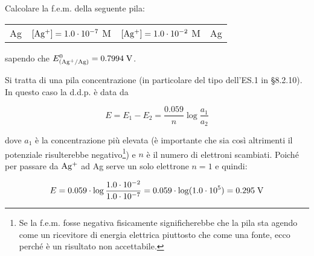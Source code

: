 \begin{esercizio}
    Calcolare la f.e.m. della seguente pila:

\begin{center}
    \begin{tabular}{p{0.6cm}|p{3.6cm}||p{3.6cm}|p{1cm}}
        Ag & $[\rm Ag^+]=1.0 \cdot 10^{-7}$ M & $[\rm Ag^+]=1.0 \cdot 10^{-2}$ M & Ag
    \end{tabular}
\end{center}

sapendo che $E^0_{(\rm Ag^{+}/Ag)}=0.7994 \; \rm V$.
\end{esercizio}
\begin{soluzione}
    Si tratta di una pila concentrazione (in particolare del tipo dell'ES.1 in §8.2.10). In questo caso la d.d.p. è data da

$$E=E_1 - E_2 = \frac{0.059}{n} \log \frac{a_1}{a_2}$$

dove $a_1$ è la concentrazione più elevata (è importante che sia così altrimenti il potenziale risulterebbe negativo\footnote{Se la f.e.m. fosse negativa fisicamente significherebbe che la pila sta agendo come un ricevitore di energia elettrica piuttosto che come una fonte, ecco perché è un risultato non accettabile.}) e $n$ è il numero di elettroni scambiati. Poiché per passare da $\rm Ag^{+}$ ad Ag serve un solo elettrone $n=1$ e quindi:

\begin{equation*}
    E=0.059 \cdot \log \frac{1.0 \cdot 10^{-2}}{1.0 \cdot 10^{-7}}
    =0.059 \cdot \log (1.0 \cdot 10^{5})
    =0.295 \; \rm V
\end{equation*}
\end{soluzione}

\newpage

